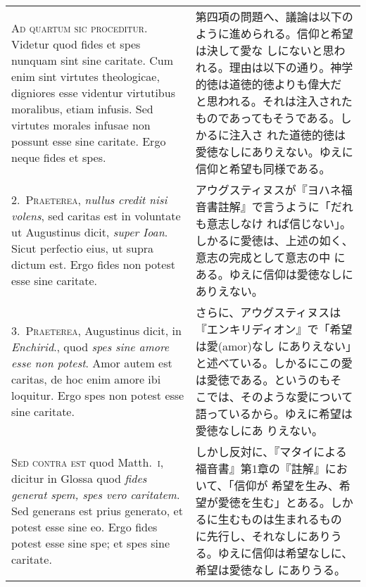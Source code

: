 \documentclass[10pt]{jsarticle}
\begin{document}
\begin{longtable}{p{21em}p{21em}}
{\scshape Ad quartum sic proceditur}. Videtur quod fides et spes
nunquam sint sine caritate. Cum enim sint virtutes theologicae,
digniores esse videntur virtutibus moralibus, etiam infusis. Sed
virtutes morales infusae non possunt esse sine caritate. Ergo neque
fides et spes.


&

 第四項の問題へ、議論は以下のように進められる。信仰と希望は決して愛な
 しにないと思われる。理由は以下の通り。神学的徳は道徳的徳よりも偉大だ
 と思われる。それは注入されたものであってもそうである。しかるに注入さ
 れた道徳的徳は愛徳なしにありえない。ゆえに信仰と希望も同様である。

\\




2.~{\scshape Praeterea}, {\itshape nullus credit nisi volens}, sed caritas est in
voluntate ut Augustinus dicit, {\itshape super Ioan}. Sicut perfectio eius, ut
supra dictum est. Ergo fides non potest esse sine caritate.

&

 アウグスティヌスが『ヨハネ福音書註解』で言うように「だれも意志しなけ
 れば信じない」。しかるに愛徳は、上述の如く、意志の完成として意志の中
 にある。ゆえに信仰は愛徳なしにありえない。

\\




3.~{\scshape Praeterea}, Augustinus dicit, in {\itshape Enchirid}.,
quod {\itshape spes sine amore esse non potest}. Amor autem est
caritas, de hoc enim amore ibi loquitur. Ergo spes non potest esse
sine caritate.


&

 さらに、アウグスティヌスは『エンキリディオン』で「希望は愛(amor)なし
 にありえない」と述べている。しかるにこの愛は愛徳である。というのもそ
 こでは、そのような愛について語っているから。ゆえに希望は愛徳なしにあ
 りえない。

\\




{\scshape Sed contra est} quod Matth.~{\scshape i}, dicitur in Glossa
quod {\itshape fides generat spem, spes vero caritatem}. Sed generans
est prius generato, et potest esse sine eo. Ergo fides potest esse
sine spe; et spes sine caritate.

&

 しかし反対に、『マタイによる福音書』第1章の『註解』において、「信仰が
 希望を生み、希望が愛徳を生む」とある。しかるに生むものは生まれるもの
 に先行し、それなしにありうる。ゆえに信仰は希望なしに、希望は愛徳なし
 にありうる。


\end{longtable}
\end{document}
